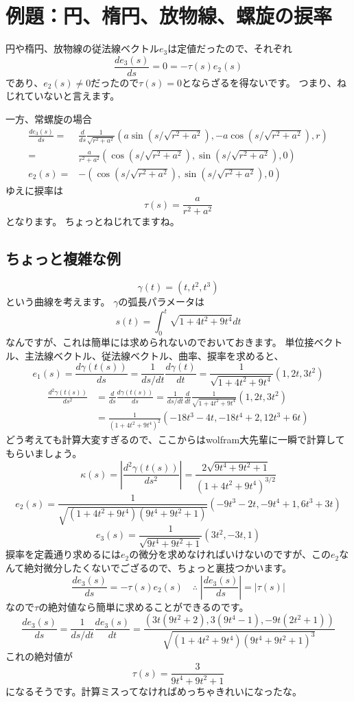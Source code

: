 \section{例題：円、楕円、放物線、螺旋の捩率}

円や楕円、放物線の従法線ベクトル$e_3$は定値だったので、それぞれ
\[
  \frac{de_3(s)}{ds}=0=-\tau(s)e_2(s)
\]
であり、$e_2(s)\neq0$だったので$\tau(s)=0$とならざるを得ないです。
つまり、ねじれていないと言えます。

一方、常螺旋の場合
\begin{align*}
  \frac{de_3(s)}{ds}=&\frac{d}{ds}\frac{1}{\sqrt{r^2+a^2}}(a\sin(s/\sqrt{r^2+a^2}),-a\cos(s/\sqrt{r^2+a^2}),r)\\
  =&\frac{a}{r^2+a^2}(\cos(s/\sqrt{r^2+a^2}),\sin(s/\sqrt{r^2+a^2}),0)\\
  e_2(s)=&-(\cos(s/\sqrt{r^2+a^2}),\sin(s/\sqrt{r^2+a^2}),0)
\end{align*}
ゆえに捩率は
\[
  \tau(s)=\frac{a}{r^2+a^2}
\]
となります。
ちょっとねじれてますね。

\subsection{ちょっと複雑な例}

\[
  \gamma(t)=(t,t^2,t^3)
\]
という曲線を考えます。
$\gamma$の弧長パラメータは
\[
  s(t)=\int_0^t\sqrt{1+4t^2+9t^4}dt
\]
なんですが、これは簡単には求められないのでおいておきます。
単位接ベクトル、主法線ベクトル、従法線ベクトル、曲率、捩率を求めると、
\[
  e_1(s)=\frac{d\gamma(t(s))}{ds}=\frac{1}{ds/dt}\frac{d\gamma(t)}{dt}=\frac{1}{\sqrt{1+4t^2+9t^4}}(1,2t,3t^2)
\]
\begin{align*}
  \frac{d^2\gamma(t(s))}{ds^2}&=\frac{d}{ds}\frac{d\gamma(t(s))}{ds}=\frac{1}{ds/dt}\frac{d}{dt}\frac{1}{\sqrt{1+4t^2+9t^4}}(1,2t,3t^2)\\
  &=\frac1{(1+4t^2+9t^4)^2}(-18t^3-4t,-18t^4+2,12t^3+6t)
\end{align*}
どう考えても計算大変すぎるので、ここからはwolfram大先輩に一瞬で計算してもらいましょう。
\[
  \kappa(s)=\left|\frac{d^2\gamma(t(s))}{ds^2}\right|=\frac{2\sqrt{9t^4+9t^2+1}}{(1+4t^2+9t^4)^{3/2}}
\]
\[
  e_2(s)=\frac{1}{\sqrt{(1+4t^2+9t^4)(9t^4+9t^2+1)}}(-9t^3-2t,-9t^4+1,6t^3+3t)
\]
\[
  e_3(s)=\frac{1}{\sqrt{9t^4+9t^2+1}}(3t^2,-3t,1)
\]
捩率を定義通り求めるには$e_2$の微分を求めなければいけないのですが、この$e_2$なんて絶対微分したくないでござるので、ちょっと裏技つかいます。
\[
  \frac{de_3(s)}{ds}=-\tau(s)e_2(s)\quad\therefore\;\left|\frac{de_3(s)}{ds}\right|=|\tau(s)|
\]
なので$\tau$の絶対値なら簡単に求めることができるのです。
\[
  \frac{de_3(s)}{ds}=\frac{1}{ds/dt}\frac{de_3(s)}{dt}=\frac{(3t(9t^2+2),3(9t^4-1),-9t(2t^2+1))}{\sqrt{(1+4t^2+9t^4)(9t^4+9t^2+1)^3}}
\]
これの絶対値が
\[
  \tau(s)=\frac3{9t^4+9t^2+1}
\]
になるそうです。計算ミスってなければめっちゃきれいになったな。
